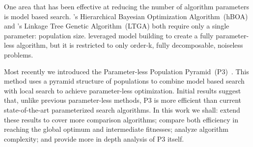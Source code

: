 One area that has been effective at reducing the number of algorithm parameters is
model based search. \cite{pelikan:2006:hboa}'s Hierarchical Bayesian Optimization
Algorithm~(hBOA) and \cite{thierens:2010:ltga}'s Linkage Tree Genetic Algorithm~(LTGA)
both require only a single parameter: population size. \cite{posik:2011:parameterless}
leveraged model building to create a fully parameter-less algorithm, but it is restricted to
only order-k, fully decomposable, noiseless problems.

Most recently we introduced the Parameter-less Population Pyramid~(P3)~\cite{goldman:2014:p3}.
This method uses a pyramid structure of populations to combine model based search with local search
to achieve parameter-less optimization. Initial results suggest that,
unlike
previous parameter-less methods, P3 is 
more efficient than current state-of-the-art
parameterized search algorithms. In this work we shall: extend these results to cover more
comparison algorithms; compare both efficiency in reaching the global optimum and intermediate
fitnesses; analyze algorithm complexity; and provide more in depth analysis of P3 itself.

